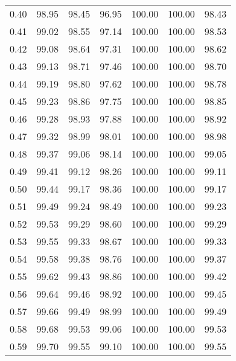 \begin{tabular}{|c|c|c|c|c|c|c|}
      0.40 &     98.95 &     98.45 &      96.95 &  100.00 &     100.00 &         98.43 \\
      0.41 &     99.02 &     98.55 &      97.14 &  100.00 &     100.00 &         98.53 \\
      0.42 &     99.08 &     98.64 &      97.31 &  100.00 &     100.00 &         98.62 \\
      0.43 &     99.13 &     98.71 &      97.46 &  100.00 &     100.00 &         98.70 \\
      0.44 &     99.19 &     98.80 &      97.62 &  100.00 &     100.00 &         98.78 \\
      0.45 &     99.23 &     98.86 &      97.75 &  100.00 &     100.00 &         98.85 \\
      0.46 &     99.28 &     98.93 &      97.88 &  100.00 &     100.00 &         98.92 \\
      0.47 &     99.32 &     98.99 &      98.01 &  100.00 &     100.00 &         98.98 \\
      0.48 &     99.37 &     99.06 &      98.14 &  100.00 &     100.00 &         99.05 \\
      0.49 &     99.41 &     99.12 &      98.26 &  100.00 &     100.00 &         99.11 \\
      0.50 &     99.44 &     99.17 &      98.36 &  100.00 &     100.00 &         99.17 \\
      0.51 &     99.49 &     99.24 &      98.49 &  100.00 &     100.00 &         99.23 \\
      0.52 &     99.53 &     99.29 &      98.60 &  100.00 &     100.00 &         99.29 \\
      0.53 &     99.55 &     99.33 &      98.67 &  100.00 &     100.00 &         99.33 \\
      0.54 &     99.58 &     99.38 &      98.76 &  100.00 &     100.00 &         99.37 \\
      0.55 &     99.62 &     99.43 &      98.86 &  100.00 &     100.00 &         99.42 \\
      0.56 &     99.64 &     99.46 &      98.92 &  100.00 &     100.00 &         99.45 \\
      0.57 &     99.66 &     99.49 &      98.99 &  100.00 &     100.00 &         99.49 \\
      0.58 &     99.68 &     99.53 &      99.06 &  100.00 &     100.00 &         99.53 \\
      0.59 &     99.70 &     99.55 &      99.10 &  100.00 &     100.00 &         99.55 \\

\end{tabular}
